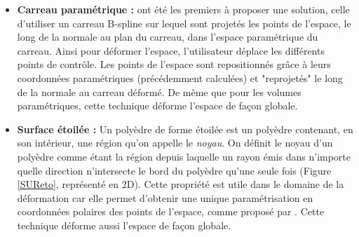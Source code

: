 \begin{itemize}
\item{\textbf{Carreau paramétrique :}} \cite{JLQ96} ont été les
  premiers à proposer une solution, celle d'utiliser un carreau
  B-spline sur lequel sont projetés les points de l'espace, le long de
  la normale au plan du carreau, dans l'espace paramétrique du
  carreau. Ainsi pour déformer l'espace, l'utilisateur déplace les
  différents points de contrôle. Les points de l'espace sont
  repositionnés grâce à leurs coordonnées paramétriques (précédemment
  calculées) et "reprojetés" le long de la normale au carreau
  déformé. De même que pour les volumes paramétriques, cette technique
  déforme l'espace de façon globale.
\item{\textbf{Surface étoilée :}} Un polyèdre de forme étoilée est un
  polyèdre contenant, en son intérieur, une région qu'on appelle le
  \textit{noyau}. On définit le noyau d'un polyèdre comme étant la
  région depuis laquelle un rayon émis dans n'importe quelle direction
  n'intersecte le bord du polyèdre qu'une seule fois (Figure
  \ref{SUReto}, représenté en 2D). Cette propriété est utile dans le
  domaine de la déformation car elle permet d'obtenir une unique
  paramétrisation en coordonnées polaires des points de l'espace,
  comme proposé par \cite{JL00}. Cette technique déforme aussi
  l'espace de façon globale.


\end{itemize}
